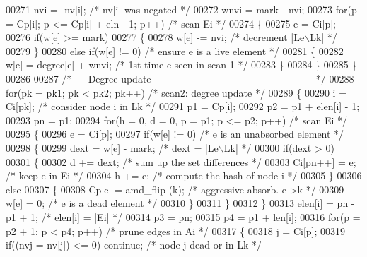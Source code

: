 \begin{DoxyCode}
00271       nvi = -nv[i];                      \textcolor{comment}{/* nv[i] was negated */}
00272       wnvi = mark - nvi;
00273       \textcolor{keywordflow}{for}(p = Cp[i]; p <= Cp[i] + eln - 1; p++)  \textcolor{comment}{/* scan Ei */}
00274       \{
00275         e = Ci[p];
00276         \textcolor{keywordflow}{if}(w[e] >= mark)
00277         \{
00278           w[e] -= nvi;          \textcolor{comment}{/* decrement |Le\(\backslash\)Lk| */}
00279         \}
00280         \textcolor{keywordflow}{else} \textcolor{keywordflow}{if}(w[e] != 0)        \textcolor{comment}{/* ensure e is a live element */}
00281         \{
00282           w[e] = degree[e] + wnvi; \textcolor{comment}{/* 1st time e seen in scan 1 */}
00283         \}
00284       \}
00285     \}
00286     
00287     \textcolor{comment}{/* --- Degree update ------------------------------------------------ */}
00288     \textcolor{keywordflow}{for}(pk = pk1; pk < pk2; pk++)    \textcolor{comment}{/* scan2: degree update */}
00289     \{
00290       i = Ci[pk];                   \textcolor{comment}{/* consider node i in Lk */}
00291       p1 = Cp[i];
00292       p2 = p1 + elen[i] - 1;
00293       pn = p1;
00294       \textcolor{keywordflow}{for}(h = 0, d = 0, p = p1; p <= p2; p++)    \textcolor{comment}{/* scan Ei */}
00295       \{
00296         e = Ci[p];
00297         \textcolor{keywordflow}{if}(w[e] != 0)             \textcolor{comment}{/* e is an unabsorbed element */}
00298         \{
00299           dext = w[e] - mark;   \textcolor{comment}{/* dext = |Le\(\backslash\)Lk| */}
00300           \textcolor{keywordflow}{if}(dext > 0)
00301           \{
00302             d += dext;         \textcolor{comment}{/* sum up the set differences */}
00303             Ci[pn++] = e;     \textcolor{comment}{/* keep e in Ei */}
00304             h += e;            \textcolor{comment}{/* compute the hash of node i */}
00305           \}
00306           \textcolor{keywordflow}{else}
00307           \{
00308             Cp[e] = amd\_flip (k);  \textcolor{comment}{/* aggressive absorb. e->k */}
00309             w[e] = 0;             \textcolor{comment}{/* e is a dead element */}
00310           \}
00311         \}
00312       \}
00313       elen[i] = pn - p1 + 1;        \textcolor{comment}{/* elen[i] = |Ei| */}
00314       p3 = pn;
00315       p4 = p1 + len[i];
00316       \textcolor{keywordflow}{for}(p = p2 + 1; p < p4; p++) \textcolor{comment}{/* prune edges in Ai */}
00317       \{
00318         j = Ci[p];
00319         \textcolor{keywordflow}{if}((nvj = nv[j]) <= 0) \textcolor{keywordflow}{continue}; \textcolor{comment}{/* node j dead or in Lk */}

\end{DoxyCode}
